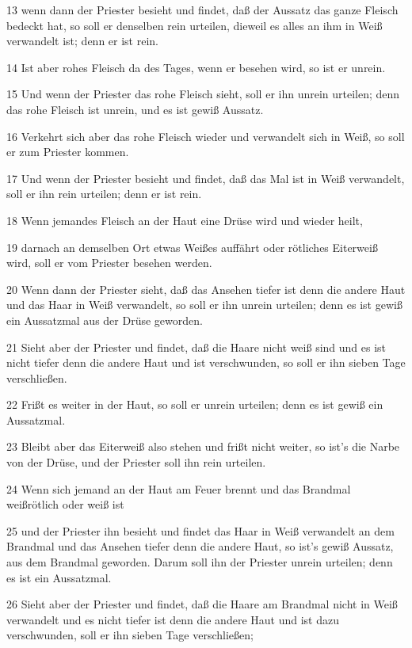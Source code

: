 \par 13 wenn dann der Priester besieht und findet, daß der Aussatz das ganze Fleisch bedeckt hat, so soll er denselben rein urteilen, dieweil es alles an ihm in Weiß verwandelt ist; denn er ist rein.
\par 14 Ist aber rohes Fleisch da des Tages, wenn er besehen wird, so ist er unrein.
\par 15 Und wenn der Priester das rohe Fleisch sieht, soll er ihn unrein urteilen; denn das rohe Fleisch ist unrein, und es ist gewiß Aussatz.
\par 16 Verkehrt sich aber das rohe Fleisch wieder und verwandelt sich in Weiß, so soll er zum Priester kommen.
\par 17 Und wenn der Priester besieht und findet, daß das Mal ist in Weiß verwandelt, soll er ihn rein urteilen; denn er ist rein.
\par 18 Wenn jemandes Fleisch an der Haut eine Drüse wird und wieder heilt,
\par 19 darnach an demselben Ort etwas Weißes auffährt oder rötliches Eiterweiß wird, soll er vom Priester besehen werden.
\par 20 Wenn dann der Priester sieht, daß das Ansehen tiefer ist denn die andere Haut und das Haar in Weiß verwandelt, so soll er ihn unrein urteilen; denn es ist gewiß ein Aussatzmal aus der Drüse geworden.
\par 21 Sieht aber der Priester und findet, daß die Haare nicht weiß sind und es ist nicht tiefer denn die andere Haut und ist verschwunden, so soll er ihn sieben Tage verschließen.
\par 22 Frißt es weiter in der Haut, so soll er unrein urteilen; denn es ist gewiß ein Aussatzmal.
\par 23 Bleibt aber das Eiterweiß also stehen und frißt nicht weiter, so ist's die Narbe von der Drüse, und der Priester soll ihn rein urteilen.
\par 24 Wenn sich jemand an der Haut am Feuer brennt und das Brandmal weißrötlich oder weiß ist
\par 25 und der Priester ihn besieht und findet das Haar in Weiß verwandelt an dem Brandmal und das Ansehen tiefer denn die andere Haut, so ist's gewiß Aussatz, aus dem Brandmal geworden. Darum soll ihn der Priester unrein urteilen; denn es ist ein Aussatzmal.
\par 26 Sieht aber der Priester und findet, daß die Haare am Brandmal nicht in Weiß verwandelt und es nicht tiefer ist denn die andere Haut und ist dazu verschwunden, soll er ihn sieben Tage verschließen;
